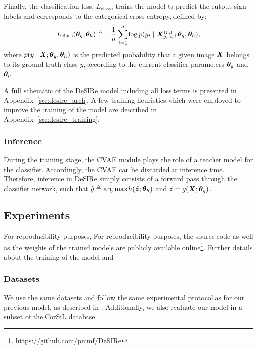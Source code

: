 Finally, the classification loss, $L_{\text{class}}$, trains the model to predict the output sign labels and corresponds to the categorical cross-entropy, defined by:
\begin{equation}
    \label{eq:desire_loss_class}
    L_{\text{class}}({\bm{\theta}}_{g},{\bm{\theta}}_{h}) \triangleq -\frac{1}{n} \sum_{i=1}^{n}\log p(y_{i} \mid {\bm{X}}^{(r_{i})}_{y_{i}, s_{i}};{\bm{\theta}}_{g},{\bm{\theta}}_{h}),
\end{equation}
where $p(y \mid {\bm{X}}; {\bm{\theta}}_{g},{\bm{\theta}}_{h})$ is the predicted probability that a given image ${\bm{X}}$ belongs to its ground-truth class $y$, according to the current classifier parameters ${\bm{\theta}}_{g}$ and ${\bm{\theta}}_{h}$.

A full schematic of the DeSIRe model including all loss terms is presented in Appendix~\ref{sec:desire_arch}. A few training heuristics which were employed to improve the training of the model are described in Appendix~\ref{sec:desire_training}.

\subsubsection{Inference}
\label{sec:desire_inference}
During the training stage, the CVAE module plays the role of a teacher model for the classifier. Accordingly, the CVAE can be discarded at inference time. Therefore, inference in DeSIRe simply consists of a forward pass through the classifier network, such that $\hat{y} \triangleq \operatorname*{arg\,max} h(\tilde{{\bm{z}}}; {\bm{\theta}}_h)$ and $\tilde{{\bm{z}}} = g({\bm{X}}; {\bm{\theta}}_g)$.

\subsection{Experiments}
\label{sec:desire_experiments}

For reproducibility purposes, For reproducibility purposes, the source code as well as the weights of the trained models are publicly available online\footnote{https://github.com/pmmf/DeSIRe}. Further details about the training of the model and

\subsubsection{Datasets}
We use the same datasets and follow the same experimental protocol as for our previous model, as described in . Additionally, we also evaluate our model in a subset of the CorSiL database.

